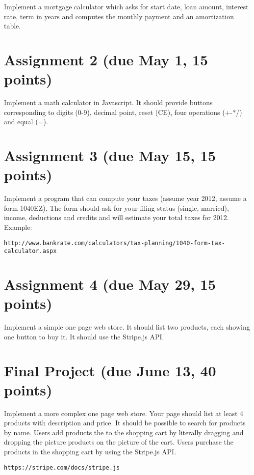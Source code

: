 \documentclass[12pt]{article}
\begin{document}
Implement a mortgage calculator which asks for start date, loan amount, interest rate, term in years and computes the monthly payment and an amortization table.

\section{Assignment 2 (due May 1, 15 points)}

Implement a math calculator in Javascript. It should provide buttons corresponding to digits (0-9), decimal point, reset (CE), four operations (+-*/) and equal (=). 

\section{Assignment 3 (due May 15, 15 points)}
Implement a program that can compute your taxes (assume year 2012, assume a form 1040EZ). The form should ask for your filing status (single, married), income, deductions and credits and will estimate your total taxes for 2012. 
Example:
{\footnotesize
\begin{verbatim}
http://www.bankrate.com/calculators/tax-planning/1040-form-tax-calculator.aspx
\end{verbatim}}

\section{Assignment 4 (due May 29, 15 points)}

Implement a simple one page web store. It should list two products, each showing one button to buy it. It should use the Stripe.js API.


\section{Final Project (due June 13, 40 points)}

Implement a more complex one page web store. Your page should list at least 4 products with description and price. It should be possible to search for products by name. Users add products the to the shopping cart by literally dragging and dropping the picture products on the picture of the cart. Users purchase the products in the shopping cart by using the Stripe.js API.

{\footnotesize
\begin{verbatim}
https://stripe.com/docs/stripe.js
\end{verbatim}}
\end{document}
